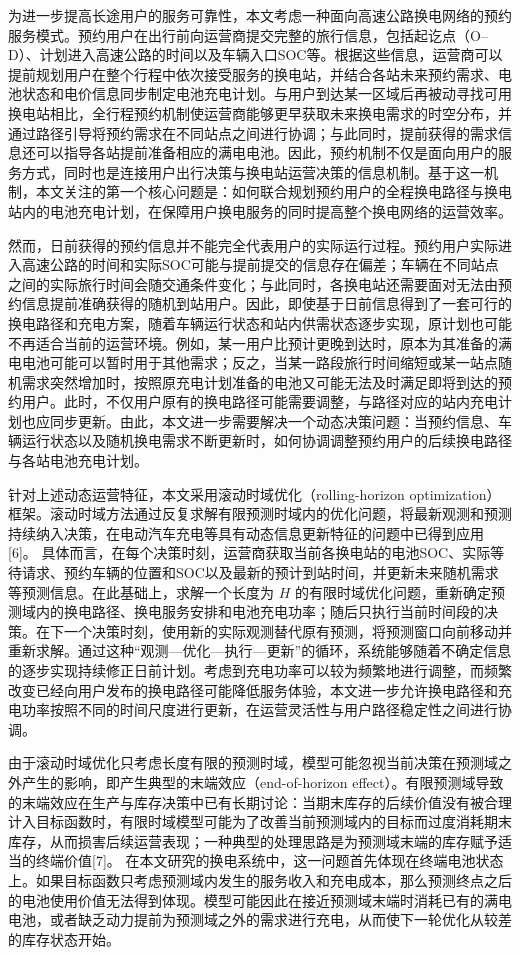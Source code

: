 为进一步提高长途用户的服务可靠性，本文考虑一种面向高速公路换电网络的预约服务模式。预约用户在出行前向运营商提交完整的旅行信息，包括起讫点（O–D）、计划进入高速公路的时间以及车辆入口SOC等。根据这些信息，运营商可以提前规划用户在整个行程中依次接受服务的换电站，并结合各站未来预约需求、电池状态和电价信息同步制定电池充电计划。与用户到达某一区域后再被动寻找可用换电站相比，全行程预约机制使运营商能够更早获取未来换电需求的时空分布，并通过路径引导将预约需求在不同站点之间进行协调；与此同时，提前获得的需求信息还可以指导各站提前准备相应的满电电池。因此，预约机制不仅是面向用户的服务方式，同时也是连接用户出行决策与换电站运营决策的信息机制。基于这一机制，本文关注的第一个核心问题是：如何联合规划预约用户的全程换电路径与换电站内的电池充电计划，在保障用户换电服务的同时提高整个换电网络的运营效率。

然而，日前获得的预约信息并不能完全代表用户的实际运行过程。预约用户实际进入高速公路的时间和实际SOC可能与提前提交的信息存在偏差；车辆在不同站点之间的实际旅行时间会随交通条件变化；与此同时，各换电站还需要面对无法由预约信息提前准确获得的随机到站用户。因此，即使基于日前信息得到了一套可行的换电路径和充电方案，随着车辆运行状态和站内供需状态逐步实现，原计划也可能不再适合当前的运营环境。例如，某一用户比预计更晚到达时，原本为其准备的满电电池可能可以暂时用于其他需求；反之，当某一路段旅行时间缩短或某一站点随机需求突然增加时，按照原充电计划准备的电池又可能无法及时满足即将到达的预约用户。此时，不仅用户原有的换电路径可能需要调整，与路径对应的站内充电计划也应同步更新。由此，本文进一步需要解决一个动态决策问题：当预约信息、车辆运行状态以及随机换电需求不断更新时，如何协调调整预约用户的后续换电路径与各站电池充电计划。

针对上述动态运营特征，本文采用滚动时域优化（rolling-horizon optimization）框架。滚动时域方法通过反复求解有限预测时域内的优化问题，将最新观测和预测持续纳入决策，在电动汽车充电等具有动态信息更新特征的问题中已得到应用[6]。 具体而言，在每个决策时刻，运营商获取当前各换电站的电池SOC、实际等待请求、预约车辆的位置和SOC以及最新的预计到站时间，并更新未来随机需求等预测信息。在此基础上，求解一个长度为 \(H\) 的有限时域优化问题，重新确定预测域内的换电路径、换电服务安排和电池充电功率；随后只执行当前时间段的决策。在下一个决策时刻，使用新的实际观测替代原有预测，将预测窗口向前移动并重新求解。通过这种“观测—优化—执行—更新”的循环，系统能够随着不确定信息的逐步实现持续修正日前计划。考虑到充电功率可以较为频繁地进行调整，而频繁改变已经向用户发布的换电路径可能降低服务体验，本文进一步允许换电路径和充电功率按照不同的时间尺度进行更新，在运营灵活性与用户路径稳定性之间进行协调。

由于滚动时域优化只考虑长度有限的预测时域，模型可能忽视当前决策在预测域之外产生的影响，即产生典型的末端效应（end-of-horizon effect）。有限预测域导致的末端效应在生产与库存决策中已有长期讨论：当期末库存的后续价值没有被合理计入目标函数时，有限时域模型可能为了改善当前预测域内的目标而过度消耗期末库存，从而损害后续运营表现；一种典型的处理思路是为预测域末端的库存赋予适当的终端价值[7]。 在本文研究的换电系统中，这一问题首先体现在终端电池状态上。如果目标函数只考虑预测域内发生的服务收入和充电成本，那么预测终点之后的电池使用价值无法得到体现。模型可能因此在接近预测域末端时消耗已有的满电电池，或者缺乏动力提前为预测域之外的需求进行充电，从而使下一轮优化从较差的库存状态开始。

